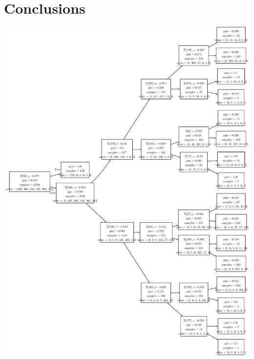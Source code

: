 \documentclass[conference,a4paper]{IEEEtran}
\begin{document}
\section{Conclusions}




\onecolumn
\appendix
\noindent\begin{minipage}{\textwidth}
    \centering
    \includegraphics[width=0.93\linewidth]{decision_tree.pdf}
    \label{fig:dt}
\end{minipage}
\end{document}

